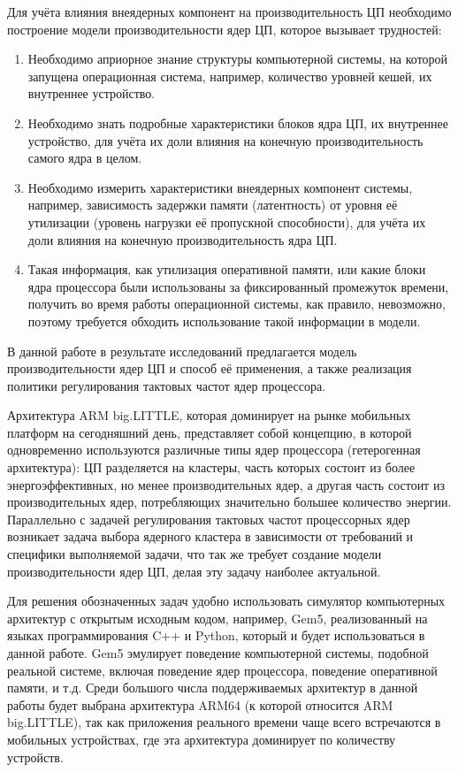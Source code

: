     Для учёта влияния внеядерных компонент на производительность ЦП необходимо построение
    модели производительности ядер ЦП, которое вызывает трудностей:
    \begin{enumerate}
        \item Необходимо априорное знание структуры компьютерной системы, на которой запущена
        операционная система, например, количество уровней кешей, их внутреннее устройство.
        \item Необходимо знать подробные характеристики блоков ядра ЦП, их внутреннее устройство, для
        учёта их доли влияния на конечную производительность самого ядра в целом.
        \item Необходимо измерить характеристики внеядерных компонент системы,
        например, зависимость задержки памяти (латентность) от уровня её утилизации (уровень
        нагрузки её пропускной способности), для учёта их доли влияния на конечную
        производительность ядра ЦП.
        \item Такая информация, как утилизация оперативной памяти, или какие блоки ядра процессора
        были использованы за фиксированный промежуток времени, получить во время работы операционной
        системы, как правило, невозможно, поэтому требуется обходить использование такой информации
        в модели.
    \end{enumerate}

    В данной работе в результате исследований предлагается модель производительности ядер ЦП и
    способ её применения, а также реализация политики регулирования тактовых частот ядер процессора.

    Архитектура ARM big.LITTLE, которая доминирует на рынке
    мобильных платформ на сегодняшний день, представляет собой концепцию, в которой одновременно
    используются различные типы ядер процессора (гетерогенная архитектура): ЦП разделяется на
    кластеры, часть которых состоит из более энергоэффективных, но менее производительных ядер,
    а другая часть состоит из производительных ядер, потребляющих значительно большее
    количество энергии. Параллельно с задачей регулирования тактовых частот
    процессорных ядер возникает задача выбора ядерного кластера в зависимости от требований и
    специфики выполняемой задачи, что так же требует создание модели производительности ядер ЦП,
    делая эту задачу наиболее актуальной.

    Для решения обозначенных задач удобно использовать симулятор компьютерных
    архитектур с открытым исходным кодом, например, Gem5, реализованный на языках программирования
    C++ и Python, который и будет использоваться в
    данной работе. Gem5 эмулирует поведение компьютерной системы, подобной реальной системе,
    включая поведение ядер процессора, поведение оперативной памяти, и т.д. Среди большого числа
    поддерживаемых архитектур в данной работы будет выбрана архитектура ARM64 (к которой относится
    ARM big.LITTLE), так как приложения реального времени чаще всего встречаются в мобильных устройствах,
    где эта архитектура доминирует по количеству устройств.

